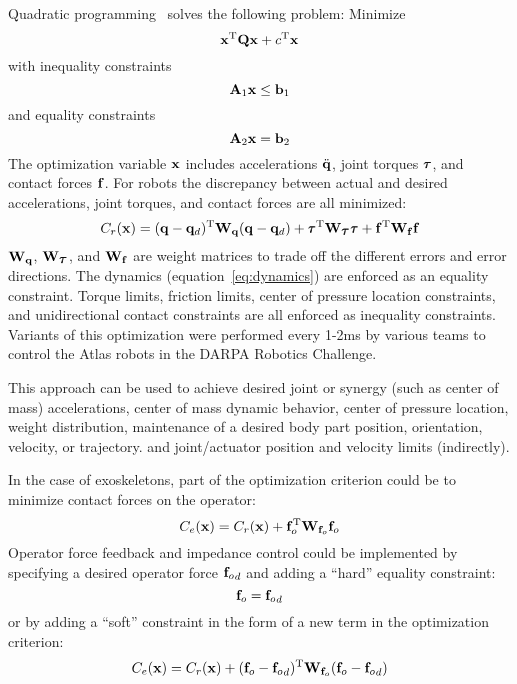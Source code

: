 \documentclass[letterpaper,12pt,fullpage]{article}
\begin{document}
Quadratic programming~\cite{Wikipedia} solves the following problem:
Minimize
\begin{equation}
{\bf x}^{{\rm T}} {\bf Q} {\bf x} + c^{{\rm T}} {\bf x}
\end{equation}
with inequality constraints
\begin{equation}
{\bf A}_1 {\bf x} \le {\bf b}_1
\end{equation}
and equality constraints
\begin{equation}
{\bf A}_2 {\bf x} = {\bf b}_2
\end{equation}
The optimization variable ${\bf x}$ includes accelerations $\ddot{{\bf q}}$, joint
torques $\vtau$, and contact forces ${\bf f}$.
For robots the discrepancy between actual and desired accelerations, joint
torques, and contact forces are all minimized:
\begin{equation}
C_r(\vx) = (\vq - \vq_d)^{\tr} \mW_{\vq} (\vq - \vq_d) + \vtau^{\tr} \mW_{\vtau} \vtau
+ \vf^{\tr} \mW_{\vf} \vf
\end{equation}
${\bf W}_{{\bf q}}$, $\mW_{\vtau}$, and ${\bf W}_{{\bf f}}$ are weight matrices to trade off the
different errors and error directions.
The dynamics (equation~\ref{eq:dynamics}) are enforced as an equality constraint.
Torque limits, friction limits, center of pressure location constraints,
and unidirectional contact constraints are all
enforced as inequality constraints.
Variants of this optimization
were performed every 1-2ms by various teams to control the
Atlas robots in the DARPA Robotics Challenge.

This approach can be used to achieve desired joint or synergy (such as center
of mass) accelerations, center of mass dynamic behavior, center of pressure location,
weight distribution, maintenance of a desired body part position, orientation,
velocity, or trajectory. and joint/actuator position and velocity limits (indirectly).

In the case of exoskeletons, 
part of the optimization criterion could be to
minimize contact forces on the operator:
\begin{equation}
C_e({\bf x}) = C_r({\bf x}) + {\bf f}^{{\rm T}}_o {\bf W}_{{\bf f}_o} {\bf f}_o
\end{equation}
Operator force feedback and impedance control could be implemented by specifying a
desired operator force ${{\bf f}_o}_d$ and adding a ``hard'' equality constraint:
\begin{equation}
{\bf f}_o = {{\bf f}_o}_d
\end{equation}
or by adding a ``soft'' constraint in the form of a new term in the optimization
criterion:
\begin{equation}
C_e({\bf x}) = C_r({\bf x}) + ({\bf f}_o - {{\bf f}_o}_d)^{{\rm T}} {\bf W}_{{\bf f}_o} ({\bf f}_o - {{\bf f}_o}_d)
\end{equation}
\end{document}
